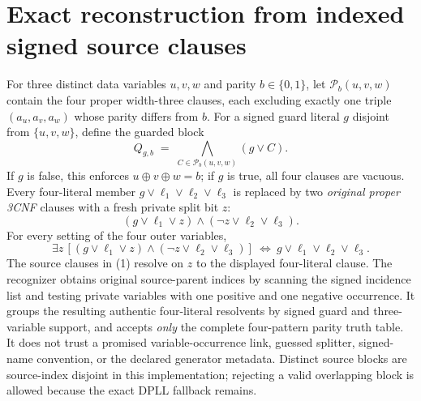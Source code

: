 \documentclass[11pt]{article}
\begin{document}
\section{Exact reconstruction from indexed signed source clauses}
For three distinct data variables $u,v,w$ and parity $b\in\{0,1\}$, let $\mathcal P_b(u,v,w)$ contain the four proper width-three clauses, each excluding exactly one triple $(a_u,a_v,a_w)$ whose parity differs from $b$. For a signed guard literal $g$ disjoint from $\{u,v,w\}$, define the guarded block
\[
 Q_{g,b} \;=\; \bigwedge_{C\in\mathcal P_b(u,v,w)}(g\lor C).
\]
If $g$ is false, this enforces $u\oplus v\oplus w=b$; if $g$ is true, all four clauses are vacuous. Every four-literal member $g\lor\ell_1\lor\ell_2\lor\ell_3$ is replaced by two \emph{original proper 3CNF} clauses with a fresh private split bit $z$:
\[
 (g\lor\ell_1\lor z)\land(\neg z\lor\ell_2\lor\ell_3).
 \tag{1}
\]
For every setting of the four outer variables,
\[
 \exists z\,[(g\lor\ell_1\lor z)\land(\neg z\lor\ell_2\lor\ell_3)]
 \ \Longleftrightarrow\ g\lor\ell_1\lor\ell_2\lor\ell_3.
 \tag{2}
\]
The source clauses in (1) resolve on $z$ to the displayed four-literal clause. The recognizer obtains original source-parent indices by scanning the signed incidence list and testing private variables with one positive and one negative occurrence. It groups the resulting authentic four-literal resolvents by signed guard and three-variable support, and accepts \emph{only} the complete four-pattern parity truth table. It does not trust a promised variable-occurrence link, guessed splitter, signed-name convention, or the declared generator metadata. Distinct source blocks are source-index disjoint in this implementation; rejecting a valid overlapping block is allowed because the exact DPLL fallback remains.
\end{document}
